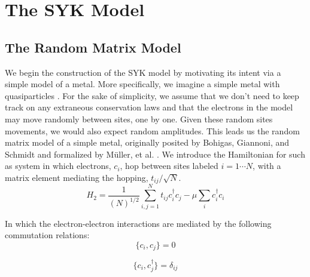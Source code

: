 \documentclass[reprint]{revtex4-2}
\begin{document}
\section{The SYK Model}
\subsection{The Random Matrix Model}
We begin the construction of the SYK model by motivating its intent via a simple model of a metal. More specifically, we imagine a simple metal with quasiparticles \cite{Sachdev_2023}. For the sake of simplicity, we assume that we don't need to keep track on any extraneous conservation laws and that the electrons in the model may move randomly between sites, one by one. Given these random sites movements, we would also expect random amplitudes. This leads us the random matrix model of a simple metal, originally posited by Bohigas, Giannoni, and Schmidt \cite{Bohigas_1984} and formalized by Müller, et al. \cite{Muller_2009}. We introduce the Hamiltonian for such as system in which electrons, $c_i$, hop between sites labeled $i = 1 \cdots N$, with a matrix element mediating the hopping, $t_{ij} / \sqrt{N}$. 
\begin{equation}
H_{2} = \frac{1}{(N)^{1/2}}\sum_{i,j =1}^{N} t_{ij}c_{i}^{\dagger}c_{j} -  \mu \sum_{i}c_{i}^{\dagger}c_{i}
\end{equation}

In which the electron-electron interactions are mediated by the following commutation relations:
\begin{equation}
    \{c_{i},c_{j}\} = 0
\end{equation}
    
 
\begin{equation}
    \{c_{i},c_{j}^{\dagger}\} = \delta_{ij}
\end{equation}
\end{document}
